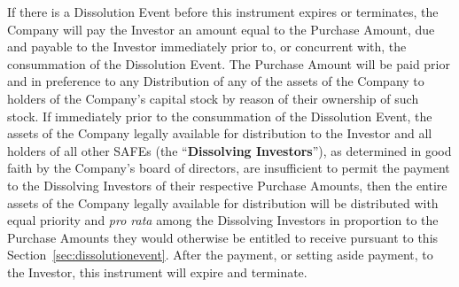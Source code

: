 \begin{sloppypar}
If there is a Dissolution Event before this instrument expires or
terminates, the Company will pay the Investor an amount equal to the
Purchase Amount, due and payable to the Investor immediately prior to,
or concurrent with, the consummation of the Dissolution Event. The
Purchase Amount will be paid prior and in preference to any
Distribution of any of the assets of the Company to holders of the
Company’s capital stock by reason of their ownership of such stock. If
immediately prior to the consummation of the Dissolution Event, the
assets of the Company legally available for distribution to the
Investor and all holders of all other SAFEs (the “\textbf{Dissolving
Investors}”), as determined in good faith by the Company’s board of
directors, are insufficient to permit the payment to the Dissolving
Investors of their respective Purchase Amounts, then the entire assets
of the Company legally available for distribution will be distributed
with equal priority and \emph{pro rata} among the Dissolving Investors
in proportion to the Purchase Amounts they would otherwise be entitled
to receive pursuant to this Section~\ref{sec:dissolutionevent}. After
the payment, or setting aside payment, to the Investor, this
instrument will expire and terminate.
\end{sloppypar}